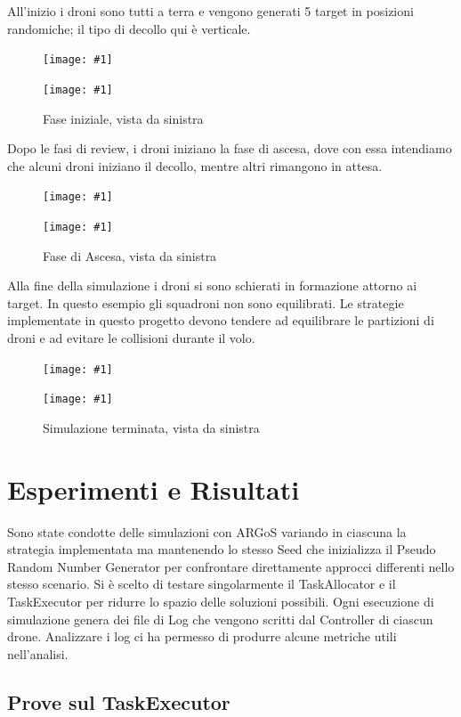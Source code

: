 \documentclass[a4paper,11pt,oneside, table]{article}
\newcommand{\putsubimage}[5] {
  \begin{minipage}{{#4}\linewidth}
	    \centering
      \texttt{[image: \#1]}
	    \caption{#2}\label{#3}
	\end{minipage}
}
\newcommand{\putimagecouple}[2] {
  \begin{figure}[!htb]
      \centering
      #1
      \hspace{0.5cm}
      #2
  \end{figure}
}
\begin{document}
All'inizio i droni sono tutti a terra e vengono generati 5 target in posizioni randomiche; il tipo di decollo qui è verticale.

\putimagecouple
{\putsubimage{images/esempio/iterazione_zero_top.png}{Fase iniziale, vista dall'alto}{png:iterazione_zero_top}{0.45}{0.99}}
{\putsubimage{images/esempio/iterazione_zero_left.png}{Fase iniziale, vista da sinistra}{png:iterazione_zero_left}{0.45}{0.99}}

Dopo le fasi di review, i droni iniziano la fase di ascesa, dove con essa intendiamo che alcuni droni iniziano il decollo, mentre altri rimangono in attesa.

\putimagecouple
{\putsubimage{images/esempio/iterazione_venti_top.png}{Fase di Ascesa, vista dall'alto}{png:iterazione_venti_top}{0.45}{0.99}}
{\putsubimage{images/esempio/iterazione_venti_left.png}{Fase di Ascesa, vista da sinistra}{png:iterazione_venti_left}{0.45}{0.99}}

Alla fine della simulazione i droni si sono schierati in formazione attorno ai target.
In questo esempio gli squadroni non sono equilibrati.
Le strategie implementate in questo progetto devono tendere ad equilibrare le partizioni di droni e ad evitare le collisioni durante il volo.

\putimagecouple
{\putsubimage{images/esempio/iterazione_finale_top.png}{Simulazione terminata, vista dall'alto}{png:iterazione_finale_top}{0.45}{0.99}}
{\putsubimage{images/esempio/iterazione_finale_left.png}{Simulazione terminata, vista da sinistra}{png:iterazione_finale_left}{0.45}{0.99}}

\pagebreak

\section{Esperimenti e Risultati}

Sono state condotte delle simulazioni con ARGoS variando in ciascuna la strategia implementata ma mantenendo lo stesso Seed che inizializza il Pseudo Random Number Generator per confrontare direttamente approcci differenti nello stesso scenario.
Si \`e scelto di testare singolarmente il TaskAllocator e il TaskExecutor per ridurre lo spazio delle soluzioni possibili.
Ogni esecuzione di simulazione genera dei file di Log che vengono scritti dal Controller di ciascun drone. Analizzare i log ci ha permesso di produrre alcune metriche utili nell'analisi.

\subsection{Prove sul TaskExecutor}
\end{document}
